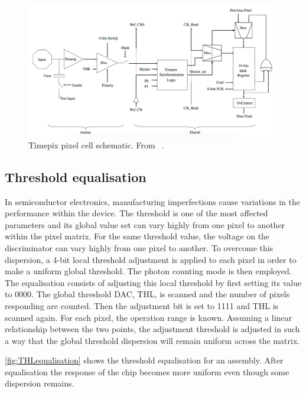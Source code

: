 \begin{figure}[htbp] 
  \centering
  \includegraphics[width=\textwidth]{./figures/Calibration/Timepix_pixel_cell_schematic.jpg}
  \caption{Timepix pixel cell schematic. From ~\cite{art:tmpx}.}
  \label{fig:Timepix_pixel_cell_schematic}
\end{figure}

\subsection{Threshold equalisation} \label{sec:ThresholdEqualisation}
In semiconductor electronics, manufacturing imperfections cause
variations in the performance within the device. The threshold is one
of the most affected parameters and its global value set can vary
highly from one pixel to another within the pixel matrix. For the same
threshold value, the voltage on the discriminator can vary highly from
one pixel to another. To overcome this dispersion, a 4-bit local
threshold adjustment is applied to each pixel in order to make a
uniform global threshold. The photon counting mode is then
employed. The equalisation consists of adjusting this local threshold
by first setting its value to 0000. The global threshold DAC, THL, is
scanned and the number of pixels responding are counted. Then the
adjustment bit is set to 1111 and THL is scanned again. For each
pixel, the operation range is known. Assuming a linear relationship
between the two points, the adjustment threshold is adjusted in such a
way that the global threshold dispersion will remain uniform across
the matrix. 

\cref{fig:THLequalisation} shows the threshold equalisation for an
assembly. After equalisation the response of the chip becomes more
uniform even though some dispersion remains.

